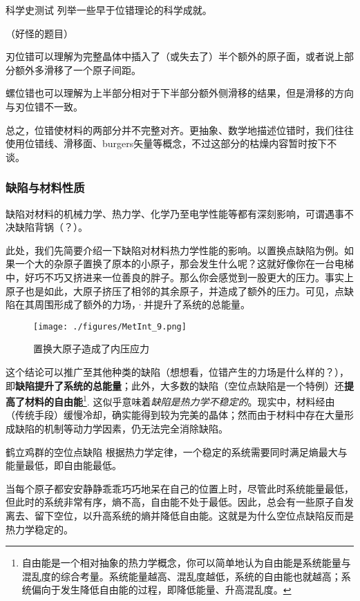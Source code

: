 \begin{exercise}{科学史测试}
列举一些早于位错理论的科学成就。

（好怪的题目）
\end{exercise}

刃位错可以理解为完整晶体中插入了（或失去了）半个额外的原子面，或者说上部分额外多滑移了一个原子间距。


螺位错也可以理解为上半部分相对于下半部分额外侧滑移的结果，但是滑移的方向与刃位错不一致。

总之，位错使材料的两部分并不完整对齐。更抽象、数学地描述位错时，我们往往使用位错线、滑移面、burgers矢量等概念，不过这部分的枯燥内容暂时按下不谈。


\subsubsection{缺陷与材料性质}
缺陷对材料的机械力学、热力学、化学乃至电学性能等都有深刻影响，可谓遇事不决缺陷背锅（？）。

此处，我们先简要介绍一下缺陷对材料热力学性能的影响。以置换点缺陷为例。如果一个大的杂原子置换了原本的小原子，那会发生什么呢？这就好像你在一台电梯中，好巧不巧又挤进来一位善良的胖子。那么你会感觉到一股更大的压力。事实上原子也是如此，大原子挤压了相邻的其余原子，并造成了额外的压力。可见，点缺陷在其周围形成了额外的力场，·并提升了系统的总能量。
\begin{figure}[ht]
\centering
\texttt{[image: ./figures/MetInt\_9.png]}
\caption{置换大原子造成了内压应力} \label{MetInt_fig9}
\end{figure}

这个结论可以推广至其他种类的缺陷（想想看，位错产生的力场是什么样的？），即\textbf{缺陷提升了系统的总能量}；此外，大多数的缺陷（空位点缺陷是一个特例）还\textbf{提高了材料的自由能}\footnote{自由能是一个相对抽象的热力学概念，你可以简单地认为自由能是系统能量与混乱度的综合考量。系统能量越高、混乱度越低，系统的自由能也就越高；系统偏向于发生降低自由能的过程，即降低能量、升高混乱度。}. 这似乎意味着\textsl{缺陷是热力学不稳定的}。现实中，材料经由（传统手段）缓慢冷却，确实能得到较为完美的晶体；然而由于材料中存在大量形成缺陷的机制等动力学因素，仍无法完全消除缺陷。

\begin{example}{鹤立鸡群的空位点缺陷}
根据热力学定律，一个稳定的系统需要同时满足熵最大与能量最低，即自由能最低。

当每个原子都安安静静乖乖巧巧地呆在自己的位置上时，尽管此时系统能量最低，但此时的系统非常有序，熵不高，自由能不处于最低。因此，总会有一些原子自发离去、留下空位，以升高系统的熵并降低自由能。这就是为什么空位点缺陷反而是热力学稳定的。
\end{example}


